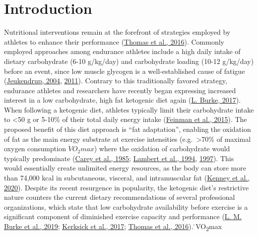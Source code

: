 \documentclass[]{cik}%
\begin{document}

\maketitle

\newpage

\captionsetup[table]{labelformat=empty}
\captionsetup[figure]{labelformat=empty}
\raggedbottom

\hypertarget{introduction}{%
\section{Introduction}\label{introduction}}

Nutritional interventions remain at the forefront of strategies employed
by athletes to enhance their performance
(\protect\hyperlink{ref-1}{Thomas et al., 2016}). Commonly employed
approaches among endurance athletes include a high daily intake of
dietary carbohydrate (6-10 g/kg/day) and carbohydrate loading (10-12
g/kg/day) before an event, since low muscle glycogen is a
well-established cause of fatigue (\protect\hyperlink{ref-2}{Jeukendrup,
2004}, \protect\hyperlink{ref-3}{2011}). Contrary to this traditionally
favored strategy, endurance athletes and researchers have recently began
expressing increased interest in a low carbohydrate, high fat ketogenic
diet again (\protect\hyperlink{ref-4}{L. Burke, 2017}). When following a
ketogenic diet, athletes typically limit their carbohydrate intake to
\textless50 g or 5-10\% of their total daily energy intake
(\protect\hyperlink{ref-5}{Feinman et al., 2015}). The proposed benefit
of this diet approach is ``fat adaptation'', enabling the oxidation of
fat as the main energy substrate at exercise intensities
(e.g.~\textgreater70\% of maximal oxygen consumption
\(\dot{V}O_{2}max\)) where the oxidation of carbohydrate would typically
predominate (\protect\hyperlink{ref-6}{Carey et al., 1985};
\protect\hyperlink{ref-7}{Lambert et al., 1994},
\protect\hyperlink{ref-8}{1997}). This would essentially create
unlimited energy resources, as the body can store more than 74,000 kcal
in subcutaneous, visceral, and intramuscular fat
(\protect\hyperlink{ref-9}{Kenney et al., 2020}). Despite its recent
resurgence in popularity, the ketogenic diet's restrictive nature
counters the current dietary recommendations of several professional
organizations, which state that low carbohydrate availability before
exercise is a significant component of diminished exercise capacity and
performance (\protect\hyperlink{ref-10}{L. M. Burke et al., 2019};
\protect\hyperlink{ref-11}{Kerksick et al., 2017};
\protect\hyperlink{ref-1}{Thomas et al., 2016}). ̇VO\textsubscript{2}max
\end{document}
